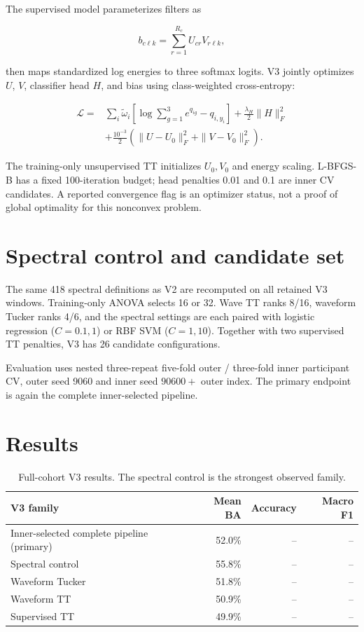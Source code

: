 The supervised model parameterizes filters as

\begin{equation}
b_{c\ell k}=\sum_{r=1}^{R_c}U_{cr}V_{r\ell k},
\end{equation}

then maps standardized log energies to three softmax logits. V3 jointly optimizes
$U$, $V$, classifier head $H$, and bias using class-weighted cross-entropy:

\begin{align}
\mathcal{L}={}&\sum_i \tilde{\omega}_i
\left[\log\sum_{g=1}^3 e^{q_{ig}}-q_{i,y_i}\right]
+\frac{\lambda_H}{2}\|H\|_F^2\\
&+\frac{10^{-3}}{2}
\left(\|U-U_0\|_F^2+\|V-V_0\|_F^2\right).
\end{align}

The training-only unsupervised TT initializes $U_0,V_0$ and energy scaling.
L-BFGS-B has a fixed 100-iteration budget; head penalties 0.01 and 0.1 are inner
CV candidates. A reported convergence flag is an optimizer status, not a proof
of global optimality for this nonconvex problem.

\section{Spectral control and candidate set}

The same 418 spectral definitions as V2 are recomputed on all retained V3
windows. Training-only ANOVA selects 16 or 32. Wave TT ranks 8/16, waveform
Tucker ranks 4/6, and the spectral settings are each paired with logistic
regression ($C=0.1,1$) or RBF SVM ($C=1,10$). Together with two supervised TT
penalties, V3 has 26 candidate configurations.

Evaluation uses nested three-repeat five-fold outer / three-fold inner
participant CV, outer seed 9060 and inner seed $90600+$ outer index. The primary
endpoint is again the complete inner-selected pipeline.

\section{Results}

\begin{table}[htbp]
\centering
\begin{tabular}{lrrr}
\toprule
\textbf{V3 family} & \textbf{Mean BA} & \textbf{Accuracy} & \textbf{Macro F1}\\
\midrule
Inner-selected complete pipeline (primary) & 52.0\% & -- & --\\
Spectral control & 55.8\% & -- & --\\
Waveform Tucker & 51.8\% & -- & --\\
Waveform TT & 50.9\% & -- & --\\
Supervised TT & 49.9\% & -- & --\\
\bottomrule
\end{tabular}
\caption{Full-cohort V3 results. The spectral control is the strongest observed family.}
\label{tab:v3-results}
\end{table}

